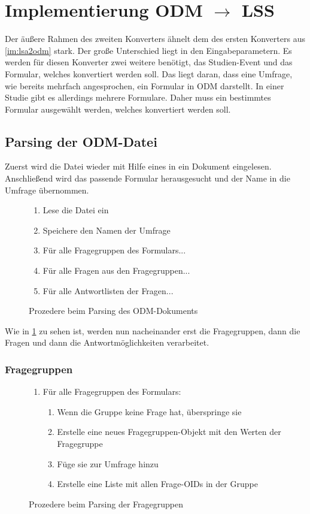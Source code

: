 \section{Implementierung ODM $\rightarrow$ LSS}

Der äußere Rahmen des zweiten Konverters ähnelt dem des ersten Konverters aus \cref{im:lsa2odm} stark.
Der große Unterschied liegt in den Eingabeparametern. Es werden für diesen Konverter zwei weitere benötigt, das Studien-Event und das Formular, welches konvertiert werden soll.
Das liegt daran, dass eine Umfrage, wie bereits mehrfach angesprochen, ein Formular in ODM darstellt.
In einer Studie gibt es allerdings mehrere Formulare. Daher muss ein bestimmtes Formular ausgewählt werden, welches konvertiert werden soll.

\subsection{Parsing der ODM-Datei}

Zuerst wird die Datei wieder mit Hilfe eines  in ein Dokument eingelesen.
Anschließend wird das passende Formular herausgesucht und der Name in die Umfrage übernommen.

\begin{figure}[h]
	\begin{enumerate}
		\item Lese die Datei ein
		\item Speichere den Namen der Umfrage
		\item Für alle Fragegruppen des Formulars...
		\item Für alle Fragen aus den Fragegruppen...
		\item Für alle Antwortlisten der Fragen...
	\end{enumerate}
	\caption{Prozedere beim Parsing des ODM-Dokuments}
	\label{alg:odm_pars}
\end{figure}

Wie in \cref{alg:odm_pars} zu sehen ist, werden nun nacheinander erst die Fragegruppen, dann die Fragen und dann die Antwortmöglichkeiten verarbeitet.

\subsubsection{Fragegruppen}

\begin{figure}[h]
	\begin{enumerate}
		\item Für alle Fragegruppen des Formulars:
			\begin{enumerate}
				\item Wenn die Gruppe keine Frage hat, überspringe sie
				\item Erstelle eine neues Fragegruppen-Objekt mit den Werten der Fragegruppe
				\item Füge sie zur Umfrage hinzu
				\item Erstelle eine Liste mit allen Frage-OIDs in der Gruppe
			\end{enumerate}
	\end{enumerate}
	\caption{Prozedere beim Parsing der Fragegruppen}
	\label{alg:odm_pars_qg}
\end{figure}

